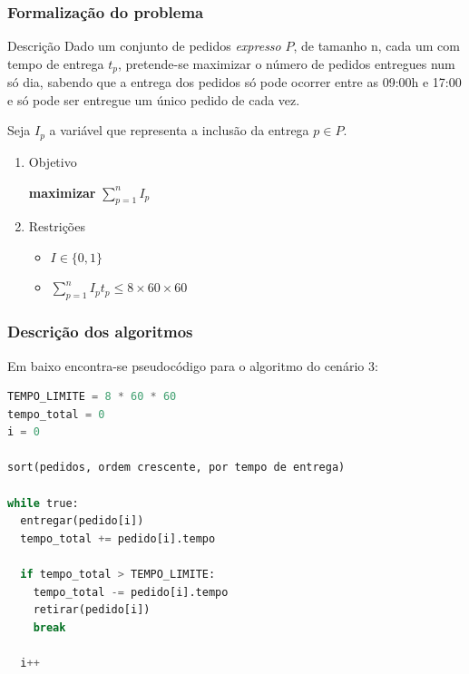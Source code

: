 \documentclass{beamer}
\begin{document}
\begin{frame}
\frametitle{Formalização do problema}
\begin{block}{Descrição}
Dado um conjunto de pedidos \textit{expresso} $P$, de tamanho n, cada um com tempo de entrega $t_{p}$, pretende-se 
maximizar o número de pedidos entregues num só dia, sabendo que a entrega dos pedidos só pode ocorrer entre as 09:00h e 17:00 e só pode ser entregue um único pedido de cada vez.
\end{block}

Seja $I_{p}$ a variável que representa a inclusão da entrega $p \in P$.

\begin{enumerate}
\setlength\itemsep{1em}
\item{Objetivo}

\textbf{maximizar} $ \sum_{p = 1}^{n} I_{p} $ 

\item{Restrições}
\begin{itemize}
  \item $ I \in \{ 0, 1 \} $
  \item $ \sum_{p = 1}^{n} I_{p}t_{p} \leq 8 \times 60 \times 60 $
\end{itemize}

\end{enumerate}

\end{frame}

\begin{frame}[fragile]
\frametitle{Descrição dos algoritmos}
Em baixo encontra-se pseudocódigo para o algoritmo do cenário 3:
\begin{lstlisting}[language=Python]
TEMPO_LIMITE = 8 * 60 * 60
tempo_total = 0
i = 0

sort(pedidos, ordem crescente, por tempo de entrega)

while true:
  entregar(pedido[i])
  tempo_total += pedido[i].tempo

  if tempo_total > TEMPO_LIMITE:
    tempo_total -= pedido[i].tempo
    retirar(pedido[i])
    break

  i++
\end{lstlisting}
\end{frame}
\end{document}

